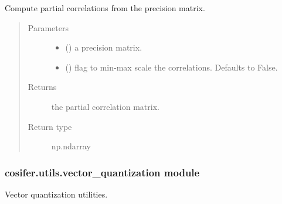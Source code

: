 \documentclass[letterpaper,10pt,english]{sphinxmanual}
\begin{document}
\begin{fulllineitems}
\label{\detokenize{_modules/cosifer.utils:cosifer.utils.stats.from_precision_matrix_partial_correlations}}
Compute partial correlations from the precision matrix.
\begin{quote}\begin{description}
\item[{Parameters}] \leavevmode\begin{itemize}
\item {} 
 () \textendash{} a precision matrix.

\item {} 
 (\sphinxstyleliteralemphasis{\sphinxupquote{, }}) \textendash{} flag to min-max scale the correlations.
Defaults to False.

\end{itemize}

\item[{Returns}] \leavevmode
the partial correlation matrix.

\item[{Return type}] \leavevmode
np.ndarray

\end{description}\end{quote}

\end{fulllineitems}



\subsubsection{cosifer.utils.vector\_quantization module}
\label{\detokenize{_modules/cosifer.utils:module-cosifer.utils.vector_quantization}}\label{\detokenize{_modules/cosifer.utils:cosifer-utils-vector-quantization-module}}
Vector quantization utilities.
\end{document}
